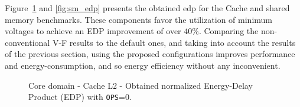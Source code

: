 Figure~\ref{fig:cache_edp} and \ref{fig:sm_edp} presents the obtained \acrshort{edp} for the Cache and shared memory benchmarks. These components favor the utilization of minimum voltages to achieve an EDP improvement of over $40\%$. Comparing the non-conventional V-F results to the default ones, and taking into account the results of the previous section, using the proposed configurations improves performance and energy-consumption, and so energy efficiency without any inconvenient.

\begin{figure}[!htb]
    \centering
    \begin{subfigmatrix}{2}
      \label{fig:cache_edp}
    \end{subfigmatrix}
    \caption{Core domain - Cache L2 - Obtained normalized Energy-Delay Product (EDP) with \texttt{OPS}=0.}
\end{figure}


